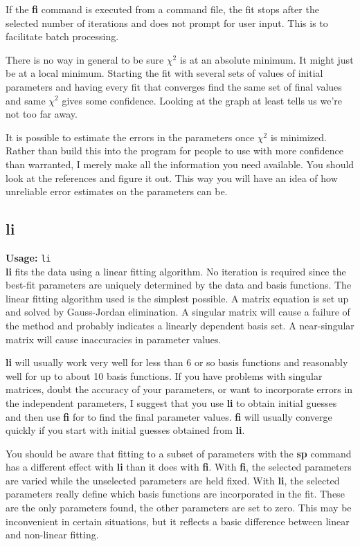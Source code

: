  If the {\bf fi} command is executed from a command file, the
 fit stops after the selected number of iterations and
 does not prompt for user input.  This is to facilitate
 batch processing.

 There is no way in general to be sure $\chi^2$ is at an 
 absolute minimum. It might just be at a local minimum. 
 Starting the fit with several sets of values of initial 
 parameters and having every fit that converges find the 
 same set of final values and same $\chi^2$ gives some 
 confidence. Looking at the graph at least tells us we're 
 not too far away.

 It is possible to estimate the errors in the parameters 
 once $\chi^2$ is minimized.  Rather than build this into the
 program for people to use with more confidence than
 warranted, I merely make all the information you need
 available. You should look at the references and figure it 
 out.  This way you will have an idea of how unreliable 
 error estimates on the parameters can be.

\subsection{li}      {\bf Usage: } {\tt  li} \\

        {\bf li} fits the data using a linear fitting algorithm.
 No iteration is required since the best-fit parameters are
 uniquely determined by the data and basis functions.  
 The linear fitting
 algorithm used is the simplest possible.  A matrix equation
 is set up and solved by Gauss-Jordan elimination.  A
 singular matrix will cause a failure of the method and
 probably indicates a linearly dependent basis set.  
 A near-singular matrix will cause inaccuracies in parameter values.  

 {\bf li} will usually work very well for less than 6 or so basis
 functions and reasonably well for up to about 10 basis
 functions. If you have problems with singular matrices,
 doubt the accuracy of your parameters, or want to
 incorporate errors in the independent parameters, I suggest
 that you use {\bf li} to obtain initial guesses and then use
 {\bf fi }for to find the final parameter values.  {\bf fi }will usually
 converge quickly if you start with initial guesses obtained
 from {\bf li}.

 You should be aware that fitting to a subset of parameters
 with the {\bf sp } command has a different effect with {\bf li} than it
 does with {\bf fi}.  With {\bf fi}, the selected parameters are varied
 while the unselected parameters are held fixed.  With {\bf li},
 the selected parameters really define which basis functions
 are incorporated in the fit.  These are the only parameters
 found,  the other parameters are set to zero.  This may be 
 inconvenient in certain situations, but it reflects a basic 
 difference between linear and non-linear fitting.

